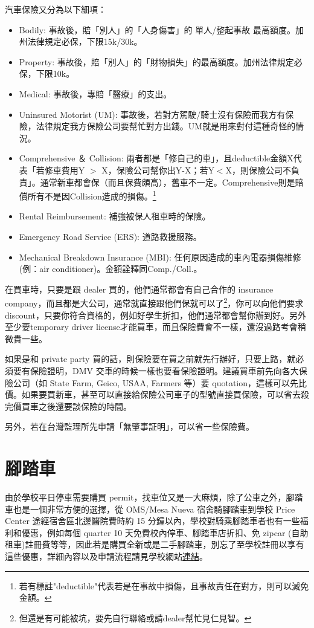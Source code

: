 \documentclass[10pt,a4paper]{book}
\begin{document}
\begin{CJK}{UTF8}{bkai}
汽車保險又分為以下細項：
\begin{itemize}
\item Bodily: 事故後，賠「別人」的「人身傷害」的 單人/整起事故 最高額度。加州法律規定必保，下限15k/30k。
\item Property: 事故後，賠「別人」的「財物損失」的最高額度。加州法律規定必保，下限10k。
\item Medical: 事故後，專賠「醫療」的支出。
\item Uninsured Motorist (UM): 事故後，若對方駕駛/騎士沒有保險而我方有保險，法律規定我方保險公司要幫忙對方出錢。UM就是用來對付這種奇怪的情況。
\item Comprehensive ＆ Collision: 兩者都是「修自己的車」，且deductible金額X代表「若修車費用Y $>$ X，保險公司幫你出Y-X；若Y$<$X，則保險公司不負責」。通常新車都會保（而且保費頗高），舊車不一定。Comprehensive則是賠償所有不是因Collision造成的損傷。\footnote{若有標註"deductible"代表若是在事故中損傷，且事故責任在對方，則可以減免金額。}
\item Rental Reimbursement: 補強被保人租車時的保險。
\item Emergency Road Service (ERS): 道路救援服務。
\item Mechanical Breakdown Insurance (MBI): 任何原因造成的車內電器損傷維修(例：air conditioner)。金額詮釋同Comp./Coll.。
\end{itemize}

在買車時，只要是跟 dealer 買的，他們通常都會有自己合作的 insurance company，而且都是大公司，通常就直接跟他們保就可以了\footnote{但還是有可能被坑，要先自行聯絡或請dealer幫忙見仁見智。}，你可以向他們要求 discount，只要你符合資格的，例如好學生折扣，他們通常都會幫你辦到好。另外至少要temporary driver license才能買車，而且保險費會不一樣，還沒過路考會稍微貴一些。

如果是和 private party 買的話，則保險要在買之前就先行辦好，只要上路，就必須要有保險證明，DMV 交車的時候一樣也要看保險證明。建議買車前先向各大保險公司（如 State Farm, Geico, USAA, Farmers 等）要 quotation，這樣可以先比價。如果要買新車，甚至可以直接給保險公司車子的型號直接買保險，可以省去殺完價買車之後還要談保險的時間。

另外，若在台灣監理所先申請「無肇事証明」，可以省一些保險費。

\section{腳踏車}

由於學校平日停車需要購買 permit，找車位又是一大麻煩，除了公車之外，腳踏車也是一個非常方便的選擇，從 OMS/Mesa Nueva 宿舍騎腳踏車到學校 Price Center 途經宿舍區北邊醫院費時約 15 分鐘以內，學校對騎乘腳踏車者也有一些福利和優惠，例如每個 quarter 10 天免費校內停車、腳踏車店折扣、免 zipcar (自助租車)註冊費等等，因此若是購買全新或是二手腳踏車，別忘了至學校註冊以享有這些優惠，詳細內容以及申請流程請見學校網站\href{http://transportation.ucsd.edu/alternatives/cycling/pedal.html}{連結}。


\end{CJK}
\end{document}
